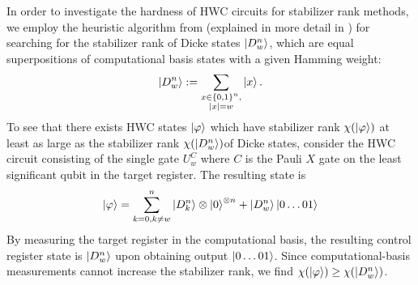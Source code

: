 In order to investigate the hardness of HWC circuits for stabilizer rank methods, we employ the heuristic algorithm from \cite{bravyi2016trading} (explained in more detail in \cite{calpin2020exploring}) for searching for the stabilizer rank of Dicke states $\ket{D^{n}_{w}}$, which are equal superpositions of computational basis states with a given Hamming weight:
\[
    \ket{D^{n}_{w}} := \sum\limits_{\substack{x \in \{0, 1\}^n, \\|x| = w}} \ket{x}
    .
\]
To see that there exists HWC states $\ket{\varphi}$ which have stabilizer rank $\chi(\ket{\varphi})$ at least as large as the stabilizer rank $\chi(\ket{D^{n}_{w}})$of Dicke states, consider the HWC circuit consisting of the single gate $U_w^C$ where $C$ is the Pauli $X$ gate on the least significant qubit in the target register.
The resulting state is
\begin{equation}
    \label{eq:dicke}
    \ket{\varphi} =
    \sum_{k=0,k\ne w}^n \ket{D^{n}_{k}}\otimes \ket{0}^{\otimes n} + \ket{D^{n}_{w}}\ket{0\ldots 01}
\end{equation}
By measuring the target register in the computational basis, the resulting control register state is $\ket{D^{n}_{w}}$ upon obtaining output $\ket{0\ldots 01}$.
Since computational-basis measurements cannot increase the stabilizer rank, we find $\chi(\ket{\varphi}) \geq \chi(\ket{D^{n}_{w}})$.

